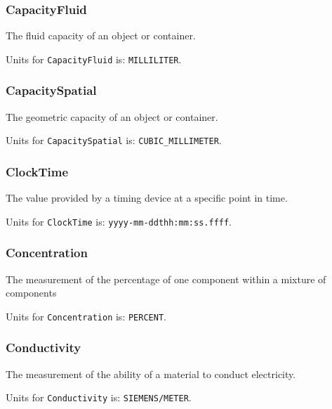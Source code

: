 \subsubsection{CapacityFluid}
  \label{sec:CapacityFluid}


The fluid capacity of an object or container.


Units for \texttt{CapacityFluid} is: \texttt{MILLILITER}.

\FloatBarrier

\subsubsection{CapacitySpatial}
  \label{sec:CapacitySpatial}


The geometric capacity of an object or container.


Units for \texttt{CapacitySpatial} is: \texttt{CUBIC_MILLIMETER}.

\FloatBarrier

\subsubsection{ClockTime}
  \label{sec:ClockTime}


The value provided by a timing device at a specific point in time.


Units for \texttt{ClockTime} is: \texttt{yyyy-mm-ddthh:mm:ss.ffff}.

\FloatBarrier

\subsubsection{Concentration}
  \label{sec:Concentration}


The measurement of the percentage of one component within a mixture of components


Units for \texttt{Concentration} is: \texttt{PERCENT}.

\FloatBarrier

\subsubsection{Conductivity}
  \label{sec:Conductivity}


The measurement of the ability of a material to conduct electricity.


Units for \texttt{Conductivity} is: \texttt{SIEMENS/METER}.

\FloatBarrier

